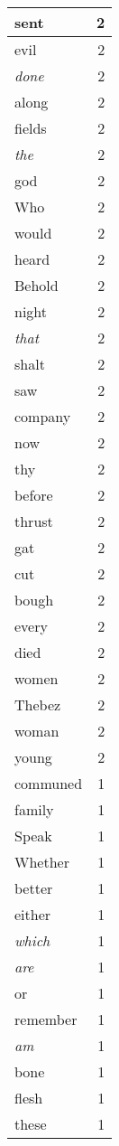 \begin{center}
\begin{longtable}{l|r}
sent & 2\\ \hline 
evil & 2\\ \hline 
\emph{done} & 2\\ \hline 
along & 2\\ \hline 
fields & 2\\ \hline 
\emph{the} & 2\\ \hline 
god & 2\\ \hline 
Who & 2\\ \hline 
would & 2\\ \hline 
heard & 2\\ \hline 
Behold & 2\\ \hline 
night & 2\\ \hline 
\emph{that} & 2\\ \hline 
shalt & 2\\ \hline 
saw & 2\\ \hline 
company & 2\\ \hline 
now & 2\\ \hline 
thy & 2\\ \hline 
before & 2\\ \hline 
thrust & 2\\ \hline 
gat & 2\\ \hline 
cut & 2\\ \hline 
bough & 2\\ \hline 
every & 2\\ \hline 
died & 2\\ \hline 
women & 2\\ \hline 
Thebez & 2\\ \hline 
woman & 2\\ \hline 
young & 2\\ \hline 
communed & 1\\ \hline 
family & 1\\ \hline 
Speak & 1\\ \hline 
Whether & 1\\ \hline 
better & 1\\ \hline 
either & 1\\ \hline 
\emph{which} & 1\\ \hline 
\emph{are} & 1\\ \hline 
or & 1\\ \hline 
remember & 1\\ \hline 
\emph{am} & 1\\ \hline 
bone & 1\\ \hline 
flesh & 1\\ \hline 
these & 1\\ \hline 

\end{longtable}
\end{center}
